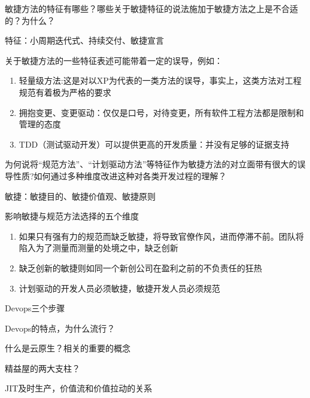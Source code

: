 \begin{problem}
敏捷方法的特征有哪些？哪些关于敏捷特征的说法施加于敏捷方法之上是不合适的？为什么？

特征：小周期迭代式、持续交付、敏捷宣言

关于敏捷方法的一些特征表述可能带着一定的误导，例如：
\begin{enumerate}[label=\arabic*.]
    \item 轻量级方法:这是对以XP为代表的一类方法的误导，事实上，这类方法对工程规范有着极为严格的要求
    \item 拥抱变更、变更驱动：仅仅是口号，对待变更，所有软件工程方法都是限制和管理的态度
    \item TDD（测试驱动开发）可以提供更高的开发质量：并没有足够的证据支持
\end{enumerate}
\end{problem}

\begin{problem}
为何说将“规范方法”、“计划驱动方法”等特征作为敏捷方法的对立面带有很大的误导性质?如何通过多种维度改进这种对各类开发过程的理解？

敏捷：敏捷目的、敏捷价值观、敏捷原则

影响敏捷与规范方法选择的五个维度
\begin{enumerate}[label=\arabic*.]
    \item 如果只有强有力的规范而缺乏敏捷，将导致官僚作风，进而停滞不前。团队将陷入为了测量而测量的处境之中，缺乏创新
    \item 缺乏创新的敏捷则如同一个新创公司在盈利之前的不负责任的狂热
    \item 计划驱动的开发人员必须敏捷，敏捷开发人员必须规范
\end{enumerate}
\end{problem}

\begin{problem}
Devops三个步骤
\end{problem}

\begin{problem}
Devops的特点，为什么流行？
\end{problem}

\begin{problem}
什么是云原生？相关的重要的概念
\end{problem}

\begin{problem}
精益屋的两大支柱？
\end{problem}

\begin{problem}
JIT及时生产，价值流和价值拉动的关系
\end{problem}


